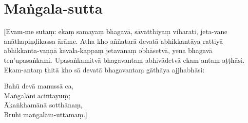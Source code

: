 \section{Maṅgala-sutta}

[Evam-me sutaṃ: ekaṃ samayaṃ bhagavā, sāvatthiyaṃ viharati, jeta-vane
anāthapiṇḍikassa ārāme. Atha kho aññatarā devatā abhikkantāya rattiyā
abhikkanta-vaṇṇā kevala-kappaṃ jetavanaṃ obhāsetvā, yena bhagavā ten'upasaṅkami.
Upasaṅkamitvā bhagavantaṃ abhivādetvā ekam-antaṃ aṭṭhāsi. Ekam-antaṃ ṭhitā kho
sā devatā bhagavantaṃ gāthāya ajjhabhāsi:

Bahū devā manussā ca,\\
Maṅgalāni acintayuṃ;\\
Ākaṅkhamānā sotthānaṃ,\\
Brūhi maṅgalam-uttamaṃ.]

\bigskip


